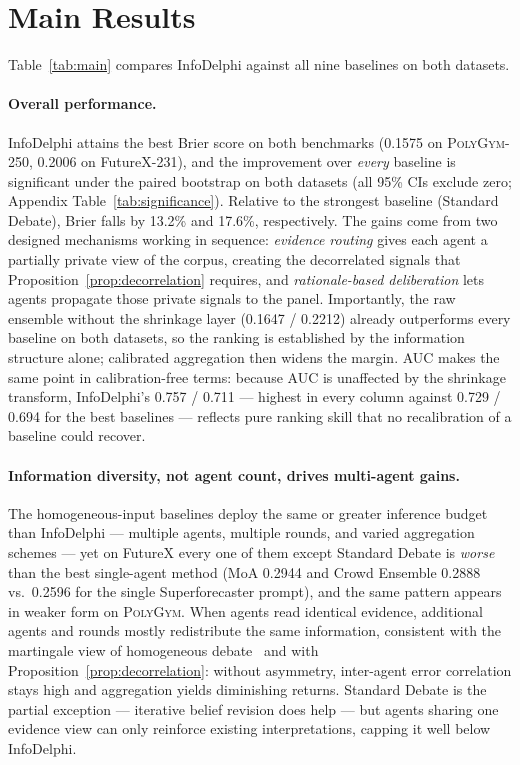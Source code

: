 \section{Main Results}
\label{sec:results}



Table~\ref{tab:main} compares InfoDelphi against all nine baselines on both datasets.

\paragraph{ Overall performance.}
InfoDelphi attains the best Brier score on both benchmarks (0.1575 on \textsc{PolyGym}-250, 0.2006 on FutureX-231), and the improvement over \emph{every} baseline is significant under the paired bootstrap on both datasets (all 95\% CIs exclude zero; Appendix Table~\ref{tab:significance}).
Relative to the strongest baseline (Standard Debate), Brier falls by 13.2\% and 17.6\%, respectively.
The gains come from two designed mechanisms working in sequence: \textit{evidence routing} gives each agent a partially private view of the corpus, creating the decorrelated signals that Proposition~\ref{prop:decorrelation} requires, and \textit{rationale-based deliberation} lets agents propagate those private signals to the panel.
Importantly, the raw ensemble without the shrinkage layer (0.1647 / 0.2212) already outperforms every baseline on both datasets, so the ranking is established by the information structure alone; calibrated aggregation then widens the margin.
AUC makes the same point in calibration-free terms: because AUC is unaffected by the shrinkage transform, InfoDelphi's 0.757 / 0.711 --- highest in every column against 0.729 / 0.694 for the best baselines --- reflects pure ranking skill that no recalibration of a baseline could recover.

\paragraph{ Information diversity, not agent count, drives multi-agent gains.}
The homogeneous-input baselines deploy the same or greater inference budget than InfoDelphi --- multiple agents, multiple rounds, and varied aggregation schemes --- yet on FutureX every one of them except Standard Debate is \emph{worse} than the best single-agent method (MoA 0.2944 and Crowd Ensemble 0.2888 vs.\ 0.2596 for the single Superforecaster prompt), and the same pattern appears in weaker form on \textsc{PolyGym}.
When agents read identical evidence, additional agents and rounds mostly redistribute the same information, consistent with the martingale view of homogeneous debate~\citep{choi2025debate} and with Proposition~\ref{prop:decorrelation}: without asymmetry, inter-agent error correlation stays high and aggregation yields diminishing returns.
Standard Debate is the partial exception --- iterative belief revision does help --- but agents sharing one evidence view can only reinforce existing interpretations, capping it well below InfoDelphi.

